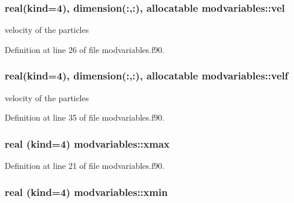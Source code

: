 \subsubsection[{\texorpdfstring{vel}{vel}}]{\setlength{\rightskip}{0pt plus 5cm}real(kind=4), dimension(\+:,\+:), allocatable modvariables\+::vel}\hypertarget{namespacemodvariables_a9f11e44143a4c5cd47740e58712bbe1c}{}\label{namespacemodvariables_a9f11e44143a4c5cd47740e58712bbe1c}


velocity of the particles 



Definition at line 26 of file modvariables.\+f90.

\subsubsection[{\texorpdfstring{velf}{velf}}]{\setlength{\rightskip}{0pt plus 5cm}real(kind=4), dimension(\+:,\+:), allocatable modvariables\+::velf}\hypertarget{namespacemodvariables_a99c2bd91d22daa7bfaa3491624db7f14}{}\label{namespacemodvariables_a99c2bd91d22daa7bfaa3491624db7f14}


velocity of the particles 



Definition at line 35 of file modvariables.\+f90.

\subsubsection[{\texorpdfstring{xmax}{xmax}}]{\setlength{\rightskip}{0pt plus 5cm}real (kind=4) modvariables\+::xmax}\hypertarget{namespacemodvariables_a9112a5edebd73d310c4594fca429a757}{}\label{namespacemodvariables_a9112a5edebd73d310c4594fca429a757}


Definition at line 21 of file modvariables.\+f90.

\subsubsection[{\texorpdfstring{xmin}{xmin}}]{\setlength{\rightskip}{0pt plus 5cm}real (kind=4) modvariables\+::xmin}\hypertarget{namespacemodvariables_aaa639d561a94ae000546755b6863b6be}{}\label{namespacemodvariables_aaa639d561a94ae000546755b6863b6be}


